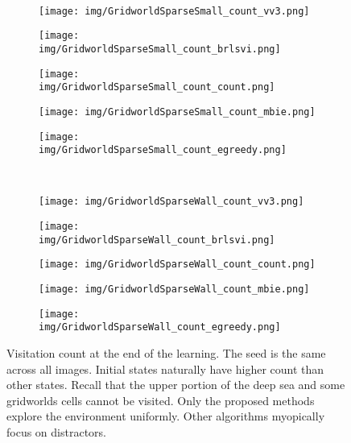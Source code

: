 \documentclass{article}
\begin{document}
\begin{figure}[t]
\begin{subfigure}[b]{.18\linewidth}
	\end{subfigure} 
	\\[0.5em]
		\begin{subfigure}[b]{.18\linewidth} 
		\centering 
		\texttt{[image: img/GridworldSparseSmall\_count\_vv3.png]}
	\end{subfigure}
	\hfill
	\begin{subfigure}[b]{.18\linewidth} 
		\centering 
		\texttt{[image: img/GridworldSparseSmall\_count\_brlsvi.png]}
	\end{subfigure} 
	\hfill
	\begin{subfigure}[b]{.18\linewidth} 
		\centering 
		\texttt{[image: img/GridworldSparseSmall\_count\_count.png]}
	\end{subfigure}
	\hfill
	\begin{subfigure}[b]{.18\linewidth} 
		\centering 
		\texttt{[image: img/GridworldSparseSmall\_count\_mbie.png]}
	\end{subfigure} 
	\hfill
	\begin{subfigure}[b]{.18\linewidth} 
		\centering 
		\texttt{[image: img/GridworldSparseSmall\_count\_egreedy.png]}
	\end{subfigure} 
	\\[0.5em]
		\begin{subfigure}[b]{.18\linewidth} 
		\centering 
		\texttt{[image: img/GridworldSparseWall\_count\_vv3.png]}
	\end{subfigure}
	\hfill
	\begin{subfigure}[b]{.18\linewidth} 
		\centering 
		\texttt{[image: img/GridworldSparseWall\_count\_brlsvi.png]}
	\end{subfigure} 
	\hfill
	\begin{subfigure}[b]{.18\linewidth} 
		\centering 
		\texttt{[image: img/GridworldSparseWall\_count\_count.png]}
	\end{subfigure}
	\hfill
	\begin{subfigure}[b]{.18\linewidth} 
		\centering 
		\texttt{[image: img/GridworldSparseWall\_count\_mbie.png]}
	\end{subfigure} 
	\hfill
	\begin{subfigure}[b]{.18\linewidth} 
		\centering 
		\texttt{[image: img/GridworldSparseWall\_count\_egreedy.png]}
	\end{subfigure} 
	\caption{\label{fig:count} Visitation count at the end of the learning. The seed is the same across all images. Initial states naturally have higher count than other states. Recall that the upper portion of the deep sea and some gridworlds cells cannot be visited. 
		Only the proposed methods explore the environment uniformly\protect\footnotemark.  
		Other algorithms myopically focus on distractors.
	}
\end{figure} 
\end{document}

